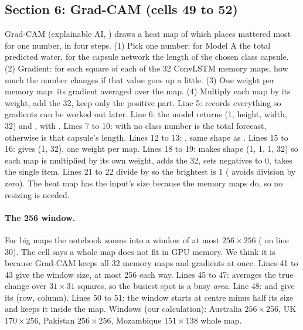 \subsection{Section 6: Grad-CAM (cells 49 to 52)}
Grad-CAM (explainable AI, ) draws a heat map of which places mattered most for one number, in four steps. (1) Pick one number: for Model A the total predicted water, for the capsule network the length of the chosen class capsule. (2) Gradient: for each square of each of the 32 ConvLSTM memory maps, how much the number changes if that value goes up a little. (3) One weight per memory map: its gradient averaged over the map. (4) Multiply each map by its weight, add the 32, keep only the positive part.
Line 5:  records everything so gradients can be worked out later. Line 6: the model returns  (1, height, width, 32) and , with . Lines 7 to 10: with no class number  is the total forecast, otherwise  is that capsule's length.
Lines 12 to 13: , same shape as . Lines 15 to 16:  gives (1, 32), one weight per map. Lines 18 to 19:  makes shape (1, 1, 1, 32) so each map is multiplied by its own weight,  adds the 32,  sets negatives to 0,  takes the single item. Lines 21 to 22 divide by  so the brightest is 1 ( avoids division by zero). The heat map has the input's size because the memory maps do, so no resizing is needed.

\paragraph{The 256 window.}
For big maps the notebook zooms into a window of at most $256\times256$ ( on line 30). The cell says a whole map does not fit in GPU memory. We think it is because Grad-CAM keeps all 32 memory maps and gradients at once. Lines 41 to 43 give the window size, at most 256 each way. Lines 45 to 47:  averages the true change over $31\times31$ squares, so the busiest spot is a busy \emph{area}. Line 48:  and  give its (row, column). Lines 50 to 51: the window starts at centre minus half its size and  keeps it inside the map. Windows (our calculation): Australia $256\times256$, UK $170\times256$, Pakistan $256\times256$, Mozambique $151\times138$ whole map.

